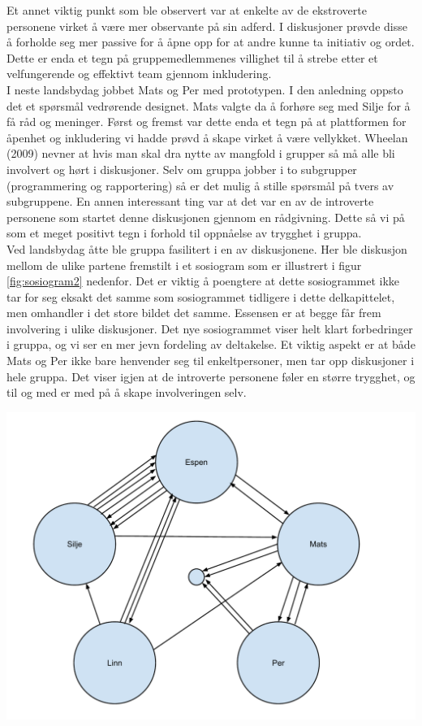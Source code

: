 Et annet viktig punkt som ble observert var at enkelte av de ekstroverte personene virket å være mer observante på sin adferd. I diskusjoner prøvde disse å forholde seg mer passive for å åpne opp for at andre kunne ta initiativ og ordet. Dette er enda et tegn på gruppemedlemmenes villighet til å strebe etter et velfungerende og effektivt team gjennom inkludering.\\

I neste landsbydag jobbet Mats og Per med prototypen. I den anledning oppsto det et spørsmål vedrørende designet. Mats valgte da å forhøre seg med Silje for å få råd og meninger. Først og fremst var dette enda et tegn på at plattformen for åpenhet og inkludering vi hadde prøvd å skape virket å være vellykket. Wheelan (2009) nevner at hvis man skal dra nytte av mangfold i grupper så må alle bli involvert og hørt i diskusjoner. Selv om gruppa jobber i to subgrupper (programmering og rapportering) så er det mulig å stille spørsmål på tvers av subgruppene. En annen interessant ting var at det var en av de introverte personene som startet denne diskusjonen gjennom en rådgivning. Dette så vi på som et meget positivt tegn i forhold til oppnåelse av trygghet i gruppa.\\

Ved landsbydag åtte ble gruppa fasilitert i en av diskusjonene. Her ble diskusjon mellom de ulike partene fremstilt i et sosiogram som er illustrert i figur \ref{fig:sosiogram2} nedenfor. Det er viktig å poengtere at dette sosiogrammet ikke tar for seg eksakt det samme som sosiogrammet tidligere i dette delkapittelet, men omhandler i det store bildet det samme. Essensen er at begge får frem involvering i ulike diskusjoner. Det nye sosiogrammet viser helt klart forbedringer i gruppa, og vi ser en mer jevn fordeling av deltakelse. Et viktig aspekt er at både Mats og Per ikke bare henvender seg  til enkeltpersoner, men tar opp diskusjoner i hele gruppa. Det viser igjen at de introverte personene føler en større trygghet, og til og med er med på å skape involveringen selv.\\

\begin{center}
\includegraphics[clip=true, width=1 \textwidth,
trim=0cm 0cm 0cm 0cm]{Sosiogram2.pdf}
\label{fig:sosiogram2}
\end{center}

